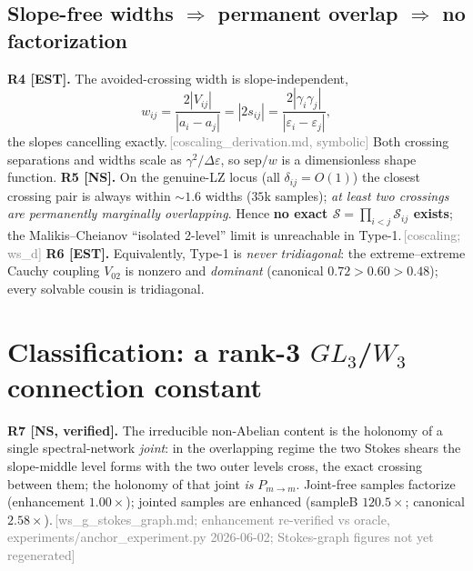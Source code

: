 \documentclass[aps,prd,reprint,nofootinbib]{revtex4-2}
\newcommand{\pnote}[1]{\textcolor{gray}{\footnotesize\,[#1]}}
\newcommand{\eps}{\varepsilon}
\newcommand{\Scat}{\mathcal{S}}   %
\newcommand{\Pmid}{P_{m\to m}}   %
\begin{document}
\subsection{Slope-free widths $\Rightarrow$ permanent overlap $\Rightarrow$ no factorization}
\textbf{R4 [EST].} The avoided-crossing width is slope-independent,
\begin{equation}
w_{ij}=\frac{2|V_{ij}|}{|a_i-a_j|}=|2s_{ij}|=\frac{2|\gamma_i\gamma_j|}{|\eps_i-\eps_j|},
\end{equation}
the slopes cancelling exactly.\pnote{coscaling\_derivation.md, symbolic} Both crossing separations
and widths scale as $\gamma^2/\Delta\eps$, so $\mathrm{sep}/w$ is a dimensionless shape function.
\textbf{R5 [NS].} On the genuine-LZ locus (all $\delta_{ij}=O(1)$) the closest crossing pair is
always within $\sim1.6$ widths ($35$k samples); \emph{at least two crossings are permanently
marginally overlapping}. Hence \textbf{no exact $\Scat=\prod_{i<j}\Scat_{ij}$ exists}; the
Malikis--Cheianov ``isolated 2-level'' limit is unreachable in Type-1.\pnote{coscaling; ws\_d}
\textbf{R6 [EST].} Equivalently, Type-1 is \emph{never tridiagonal}: the extreme--extreme Cauchy
coupling $V_{02}$ is nonzero and \emph{dominant} (canonical $0.72>0.60>0.48$); every solvable cousin
is tridiagonal.

\section{Classification: a rank-3 $GL_3$/$W_3$ connection constant}\label{sec:class}
\textbf{R7 [NS, verified].} The irreducible non-Abelian content is the holonomy of a single
spectral-network \emph{joint}: in the overlapping regime the two Stokes shears the slope-middle
level forms with the two outer levels cross, the exact crossing between them; the holonomy of that
joint \emph{is} $\Pmid$. Joint-free samples factorize (enhancement $1.00\times$); jointed samples are
enhanced (sampleB $120.5\times$; canonical $2.58\times$).\pnote{ws\_g\_stokes\_graph.md; enhancement
re-verified vs oracle, experiments/anchor\_experiment.py 2026-06-02; Stokes-graph figures not yet
regenerated}
\end{document}
